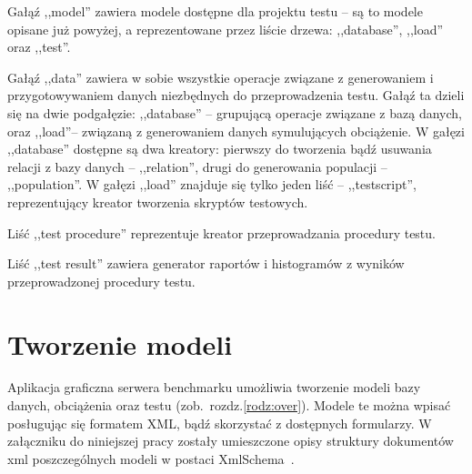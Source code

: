Gałąź ,,model'' zawiera modele dostępne dla projektu testu -- są to modele opisane już powyżej, 
a reprezentowane przez liście drzewa: ,,database'', ,,load'' oraz ,,test''.

Gałąź ,,data'' zawiera w sobie wszystkie operacje związane z generowaniem i przygotowywaniem danych niezbędnych
do przeprowadzenia testu. Gałąź ta dzieli się na dwie podgałęzie: ,,database'' -- grupującą operacje
związane z bazą danych, oraz ,,load''-- związaną z generowaniem danych symulujących obciążenie.
W gałęzi ,,database'' dostępne są dwa kreatory: pierwszy do tworzenia bądź usuwania relacji z bazy danych -- ,,relation'',
drugi do generowania populacji -- ,,population''. W gałęzi ,,load'' znajduje się tylko jeden liść -- ,,testscript'', 
reprezentujący kreator tworzenia skryptów testowych. 

Liść ,,test procedure'' reprezentuje kreator przeprowadzania procedury testu.

Liść ,,test result'' zawiera generator raportów i histogramów z wyników przeprowadzonej procedury testu.

\section{Tworzenie modeli}
Aplikacja graficzna serwera benchmarku umożliwia tworzenie modeli bazy danych, obciążenia oraz testu (zob.~rozdz.\ref{rodz:over}). 
Modele te można wpisać posługując się formatem XML, bądź skorzystać z dostępnych formularzy. W załączniku do niniejszej pracy zostały
umieszczone opisy struktury dokumentów xml poszczególnych modeli w postaci XmlSchema~\cite{XmlSchema1}.

